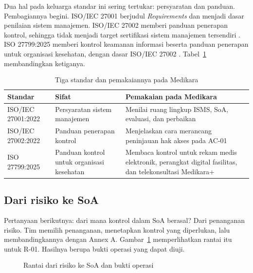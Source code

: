 Dua hal pada keluarga standar ini sering tertukar: persyaratan dan panduan. Pembagiannya begini.
ISO/IEC 27001 berjudul \textit{Requirements} dan menjadi dasar penilaian sistem manajemen. ISO/IEC
27002 memberi panduan penerapan kontrol, sehingga tidak menjadi target sertifikasi sistem manajemen
tersendiri \cite{iso27001-2022,iso27002-2022}. ISO 27799:2025 memberi kontrol keamanan informasi
beserta panduan penerapan untuk organisasi kesehatan, dengan dasar ISO/IEC 27002 \cite{iso27799-2025}.
Tabel~\ref{tab:ch06-standar} membandingkan ketiganya.

\begin{table}[!htb]
  \centering\small
  \caption{Tiga standar dan pemakaiannya pada Medikara}\label{tab:ch06-standar}
  \begin{tabularx}{\textwidth}{|>{\raggedright\arraybackslash}p{}|>{\raggedright\arraybackslash}p{}|>{\raggedright\arraybackslash}X|}
    \hline
    \textbf{Standar} & \textbf{Sifat} & \textbf{Pemakaian pada Medikara} \\ \hline
    ISO/IEC 27001:2022 & Persyaratan sistem manajemen & Menilai ruang lingkup ISMS, SoA, evaluasi,
    dan perbaikan \\ \hline
    ISO/IEC 27002:2022 & Panduan penerapan kontrol & Menjelaskan cara merancang peninjauan hak akses
    pada AC-01 \\ \hline
    ISO 27799:2025 & Panduan kontrol untuk organisasi kesehatan & Membaca kontrol untuk rekam medis
    elektronik, perangkat digital fasilitas, dan telekonsultasi Medikara+ \\ \hline
  \end{tabularx}
\end{table}

\subsection*{Dari risiko ke SoA}

Pertanyaan berikutnya: dari mana kontrol dalam SoA berasal? Dari penanganan risiko. Tim memilih
penanganan, menetapkan kontrol yang diperlukan, lalu membandingkannya dengan Annex A.
Gambar~\ref{fig:ch06-rantai-soa} memperlihatkan rantai itu untuk R-01. Hasilnya berupa bukti operasi
yang dapat diuji.

\begin{figure}[!htb]
  \centering
  
  \caption{Rantai dari risiko ke SoA dan bukti operasi}
  \label{fig:ch06-rantai-soa}
\end{figure}

